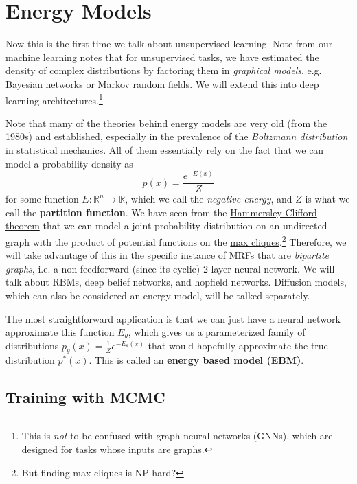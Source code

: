 \section{Energy Models} 

  Now this is the first time we talk about unsupervised learning. Note from our  \hyperref[ml-sec:graphical-models]{machine learning notes} that for unsupervised tasks, we have estimated the density of complex distributions by factoring them in \textit{graphical models}, e.g. Bayesian networks or Markov random fields. We will extend this into deep learning architectures.\footnote{This is \textit{not} to be confused with graph neural networks (GNNs), which are designed for tasks whose inputs are graphs.} 

  Note that many of the theories behind energy models are very old (from the 1980s) and established, especially in the prevalence of the \textit{Boltzmann distribution} in statistical mechanics. All of them essentially rely on the fact that we can model a probability density as 
  \begin{equation}
    p(x) = \frac{e^{-E(x)}}{Z}
  \end{equation}
  for some function $E: \mathbb{R}^n \rightarrow \mathbb{R}$, which we call the \textit{negative energy}, and $Z$ is what we call the \textbf{partition function}. We have seen from the \hyperref[ml-hammersley]{Hammersley-Clifford theorem} that we can model a joint probability distribution on an undirected graph with the product of potential functions on the \hyperref[algo-max-clique-np-hard]{max cliques}.\footnote{But finding max cliques is NP-hard?} Therefore, we will take advantage of this in the specific instance of MRFs that are \textit{bipartite graphs}, i.e. a non-feedforward (since its cyclic) 2-layer neural network. We will talk about RBMs, deep belief networks, and hopfield networks. Diffusion models, which can also be considered an energy model, will be talked separately. 

  The most straightforward application is that we can just have a neural network approximate this function $E_\theta$, which gives us a parameterized family of distributions $p_\theta (x) = \frac{1}{Z} e^{-E_\theta (x)}$ that would hopefully approximate the true distribution $p^\ast (x)$. This is called an \textbf{energy based model (EBM)}. 

\subsection{Training with MCMC}


